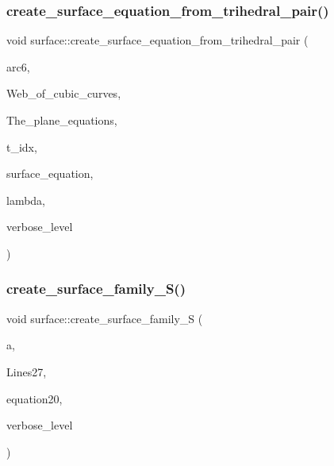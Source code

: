 \subsubsection{\texorpdfstring{create\+\_\+surface\+\_\+equation\+\_\+from\+\_\+trihedral\+\_\+pair()}{create\_surface\_equation\_from\_trihedral\_pair()}}
{\footnotesize\ttfamily void surface\+::create\+\_\+surface\+\_\+equation\+\_\+from\+\_\+trihedral\+\_\+pair (\begin{DoxyParamCaption}\item[{\mbox{\hyperlink{galois_8h_a09fddde158a3a20bd2dcadb609de11dc}{I\+NT}} $\ast$}]{arc6,  }\item[{\mbox{\hyperlink{galois_8h_a09fddde158a3a20bd2dcadb609de11dc}{I\+NT}} $\ast$}]{Web\+\_\+of\+\_\+cubic\+\_\+curves,  }\item[{\mbox{\hyperlink{galois_8h_a09fddde158a3a20bd2dcadb609de11dc}{I\+NT}} $\ast$}]{The\+\_\+plane\+\_\+equations,  }\item[{\mbox{\hyperlink{galois_8h_a09fddde158a3a20bd2dcadb609de11dc}{I\+NT}}}]{t\+\_\+idx,  }\item[{\mbox{\hyperlink{galois_8h_a09fddde158a3a20bd2dcadb609de11dc}{I\+NT}} $\ast$}]{surface\+\_\+equation,  }\item[{\mbox{\hyperlink{galois_8h_a09fddde158a3a20bd2dcadb609de11dc}{I\+NT}} \&}]{lambda,  }\item[{\mbox{\hyperlink{galois_8h_a09fddde158a3a20bd2dcadb609de11dc}{I\+NT}}}]{verbose\+\_\+level }\end{DoxyParamCaption})}

\mbox{\label{classsurface_a820199c4eab279fad1085a308550fa8f}} 
\subsubsection{\texorpdfstring{create\+\_\+surface\+\_\+family\+\_\+\+S()}{create\_surface\_family\_S()}}
{\footnotesize\ttfamily void surface\+::create\+\_\+surface\+\_\+family\+\_\+S (\begin{DoxyParamCaption}\item[{\mbox{\hyperlink{galois_8h_a09fddde158a3a20bd2dcadb609de11dc}{I\+NT}}}]{a,  }\item[{\mbox{\hyperlink{galois_8h_a09fddde158a3a20bd2dcadb609de11dc}{I\+NT}} $\ast$}]{Lines27,  }\item[{\mbox{\hyperlink{galois_8h_a09fddde158a3a20bd2dcadb609de11dc}{I\+NT}} $\ast$}]{equation20,  }\item[{\mbox{\hyperlink{galois_8h_a09fddde158a3a20bd2dcadb609de11dc}{I\+NT}}}]{verbose\+\_\+level }\end{DoxyParamCaption})}

